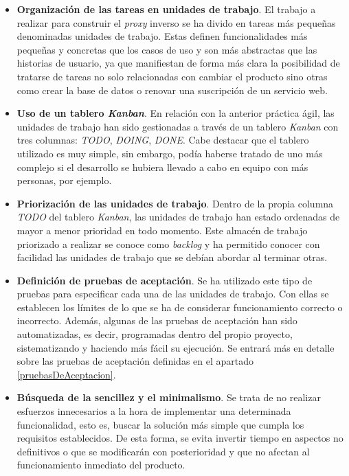 \documentclass[11pt,spanish,listoffigures]{tfgetsinf}
\begin{document}
\begin{itemize}

	\item \textbf{Organización de las tareas en unidades de trabajo}. El trabajo a realizar para construir el \emph{proxy} inverso se ha divido en tareas más pequeñas denominadas unidades de trabajo. Estas definen funcionalidades más pequeñas y concretas que los casos de uso y son más abstractas que las historias de usuario, ya que manifiestan de forma más clara la posibilidad de tratarse de tareas no solo relacionadas con cambiar el producto sino otras como crear la base de datos o renovar una suscripción de un servicio web.

	\item \textbf{Uso de un tablero \emph{Kanban}}. En relación con la anterior práctica ágil, las unidades de trabajo han sido gestionadas a través de un tablero \emph{Kanban} con tres columnas: \emph{TODO}, \emph{DOING}, \emph{DONE}. Cabe destacar que el tablero utilizado es muy simple, sin embargo, podía haberse tratado de uno más complejo si el desarrollo se hubiera llevado a cabo en equipo con más personas, por ejemplo.

	\item \textbf{Priorización de las unidades de trabajo}. Dentro de la propia columna \emph{TODO} del tablero \emph{Kanban}, las unidades de trabajo han estado ordenadas de mayor a menor prioridad en todo momento. Este almacén de trabajo priorizado a realizar se conoce como \emph{backlog} y ha permitido conocer con facilidad las unidades de trabajo que se debían abordar al terminar otras.

	\item \textbf{Definición de pruebas de aceptación}. Se ha utilizado este tipo de pruebas para especificar cada una de las unidades de trabajo. Con ellas se establecen los límites de lo que se ha de considerar funcionamiento correcto o incorrecto. Además, algunas de las pruebas de aceptación han sido automatizadas, es decir, programadas dentro del propio proyecto, sistematizando y haciendo más fácil su ejecución. Se entrará más en detalle sobre las pruebas de aceptación definidas en el apartado \ref{pruebasDeAceptacion}.

	\item \textbf{Búsqueda de la sencillez y el minimalismo}. Se trata de no realizar esfuerzos innecesarios a la hora de implementar una determinada funcionalidad, esto es, buscar la solución más simple que cumpla los requisitos establecidos. De esta forma, se evita invertir tiempo en aspectos no definitivos o que se modificarán con posterioridad y que no afectan al funcionamiento inmediato del producto.


\end{itemize}
\end{document}
